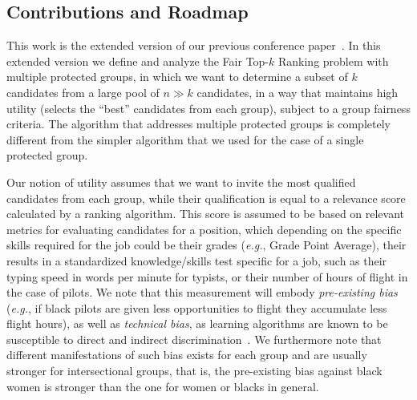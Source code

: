 \subsection{Contributions and Roadmap}
This work is the extended version of our previous conference paper~\cite{zehlike2017fair}.
In this extended version we define and analyze the {\sc Fair Top-$k$ Ranking problem} with multiple protected groups, in which we want to determine a subset of $k$ candidates from a large pool of $n \gg k$ candidates, in a way that maintains high utility (selects the ``best'' candidates from each group), subject to a group fairness criteria.
%
The algorithm that addresses multiple protected groups is completely different from the simpler algorithm that we used for the case of a single protected group.
%
%

Our notion of utility assumes that we want to invite the most qualified candidates from each group, while their qualification is equal to a relevance score calculated by a ranking algorithm.
%
This score is assumed to be based on relevant metrics for evaluating candidates for a position, which depending on the specific skills required for the job could be their grades ({\em e.g.}, Grade Point Average), their results in a standardized knowledge/skills test specific for a job, such as their typing speed in words per minute for typists, or their number of hours of flight in the case of pilots.
%
We note that this measurement will embody \emph{pre-existing bias} ({\em e.g.}, if black pilots are given less opportunities to flight they accumulate less flight hours), as well as \emph{technical bias}, as learning algorithms are known to be susceptible to direct and indirect discrimination~\cite{tuto2016,HajianFerrer12}.
%
We furthermore note that different manifestations of such bias exists for each group and are usually stronger for intersectional groups, that is, the pre-existing bias against black women is stronger than the one for women or blacks in general.
%

